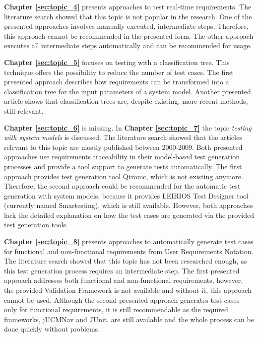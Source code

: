 \textbf{Chapter \ref{sec:topic_4}} presents approaches to test real-time requirements. The literature search showed that this topic is not popular in the research. One of the presented approaches \cite{Siegl2010} involves manually executed, intermediate steps. Therefore, this approach cannot be recommended in the presented form. The other approach \cite{Guan2015} executes all intermediate steps automatically and can be recommended for usage.

\textbf{Chapter \ref{sec:topic_5}} focuses on testing with a classification tree. This technique offers the possibility to reduce the number of test cases. The first presented approach \cite{Conrad} describes how requirements can be transformed into a classification tree for the input parameters of a system model. Another presented article \cite{Belli} shows that classification trees are, despite existing, more recent methods, still relevant.

\textbf{Chapter \ref{sec:topic_6}} is missing.
\newpage
In \textbf{Chapter \ref{sec:topic_7}} the topic \textit{testing with system models} is discussed. The literature search showed that the articles relevant to this topic are mostly published between 2000-2009. Both presented approaches use requirements traceability in their model-based test generation processes and provide a tool support to generate tests automatically. The first approach \cite{Paper1} provides test generation tool Qtronic, which is not existing anymore. Therefore, the second approach \cite{Paper2} could be recommended for the automatic test generation with system models, because it provides LEIRIOS Test Designer tool (currently named Smartesting), which is still available. However, both approaches lack the detailed explanation on how the test cases are generated via the provided test generation tools.

\textbf{Chapter \ref{sec:topic_8}} presents approaches to automatically generate test cases for functional and non-functional requirements from User Requirements Notation. The literature search showed that this topic has not been researched enough, as this test generation process requires an intermediate step. The first presented approach \cite{ArnoldCorriveauShi2010} addresses both functional and non-functional requirements, however, the provided Validation Framework is not available and without it, this approach cannot be used. Although the second presented approach \cite{BoucherMussbacher2017} generates test cases only for functional requirements, it is still recommendable as the required frameworks, jUCMNav and JUnit, are still available and the whole process can be done quickly without problems. 

